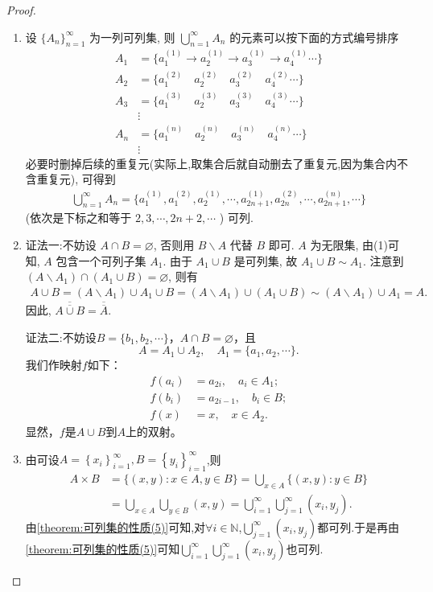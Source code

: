 \documentclass[../../main.tex]{subfiles}%
\begin{document}
\begin{proof}
\begin{enumerate}[(1)]
\item 设 $\{A_n\}_{n = 1}^{\infty}$ 为一列可列集, 则 $\bigcup_{n = 1}^{\infty} A_n$ 的元素可以按下面的方式编号排序
\begin{align*}
A_1 &= \{a_1^{(1)} \to a_2^{(1)} \to a_3^{(1)} \to a_4^{(1)} \cdots\}\\
A_2 &= \{a_1^{(2)} \quad a_2^{(2)} \quad a_3^{(2)} \quad a_4^{(2)} \cdots\}\\
A_3 &= \{a_1^{(3)} \quad a_2^{(3)} \quad a_3^{(3)} \quad a_4^{(3)} \cdots\}\\
&\vdots\\
A_n &= \{a_1^{(n)} \quad a_2^{(n)} \quad a_3^{(n)} \quad a_4^{(n)} \cdots\}\\
&\vdots
\end{align*}
必要时删掉后续的重复元(实际上,取集合后就自动删去了重复元,因为集合内不含重复元), 可得到
\begin{align*}
\bigcup_{n = 1}^{\infty} A_n = \{a_1^{(1)}, a_1^{(2)}, a_2^{(1)}, \cdots, a_{2n + 1}^{(1)}, a_{2n}^{(2)}, \cdots, a_{2n + 1}^{(n)}, \cdots\}
\end{align*}
(依次是下标之和等于 $2, 3, \cdots, 2n + 2, \cdots$ ) 可列.


\item {\color{blue}证法一:}不妨设 $A \cap B = \varnothing$, 否则用 $B\backslash A$ 代替 $B$ 即可. $A$ 为无限集, 由(1)可知, $A$ 包含一个可列子集 $A_1$. 由于 $A_1 \cup B$ 是可列集, 故 $A_1 \cup B \sim A_1$. 注意到 $(A\backslash A_1) \cap (A_1 \cup B) = \varnothing$, 则有
\begin{align*}
A \cup B = (A\backslash A_1) \cup A_1 \cup B
= (A\backslash A_1) \cup (A_1 \cup B) \sim (A\backslash A_1) \cup A_1 = A.
\end{align*}
因此, $\overline{\overline{A \cup B}} = \overline{\overline{A}}$. 

{\color{blue}证法二:}不妨设\(B = \{b_1,b_2,\cdots\}\)，\(A\cap B=\varnothing\)，且
\[A = A_1\cup A_2, \quad A_1 = \{a_1,a_2,\cdots\}.\]
我们作映射\(f\)如下：
\begin{align*}
f(a_i)&=a_{2i}, \quad a_i\in A_1;\\
f(b_i)&=a_{2i - 1}, \quad b_i\in B;\\
f(x)&=x, \quad x\in A_2.
\end{align*}
显然，\(f\)是\(A\cup B\)到\(A\)上的双射。

\item 由可设$A=\left\{ x_i \right\} _{i=1}^{\infty},B=\left\{ y_i \right\} _{i=1}^{\infty}$,则
\begin{align*}
A\times B&=\{(x,y):x\in A,y\in B\}=\bigcup_{x\in A}{\{(x,y):y}\in B\}
\\
&=\bigcup_{x\in A}{\bigcup_{y\in B}{\left( x,y \right)}}=\bigcup_{i=1}^{\infty}{\bigcup_{j=1}^{\infty}{\left( x_i,y_j \right)}}.
\end{align*}
由\ref{theorem:可列集的性质(5)}可知,对$\forall i\in \mathbb{N}$,$\bigcup_{j=1}^{\infty}{\left( x_i,y_j \right)}$都可列.于是再由\ref{theorem:可列集的性质(5)}可知$\bigcup_{i=1}^{\infty}{\bigcup_{j=1}^{\infty}{\left( x_i,y_j \right)}}$也可列.


\end{enumerate}
\end{proof}
\end{document}
